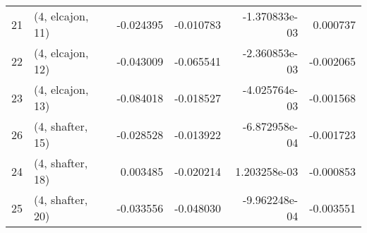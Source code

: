 \begin{tabular}{llrrrr}
21 &  (4, elcajon, 11) & -0.024395 & -0.010783 & -1.370833e-03 &  0.000737 \\
22 &  (4, elcajon, 12) & -0.043009 & -0.065541 & -2.360853e-03 & -0.002065 \\
23 &  (4, elcajon, 13) & -0.084018 & -0.018527 & -4.025764e-03 & -0.001568 \\
26 &  (4, shafter, 15) & -0.028528 & -0.013922 & -6.872958e-04 & -0.001723 \\
24 &  (4, shafter, 18) &  0.003485 & -0.020214 &  1.203258e-03 & -0.000853 \\
25 &  (4, shafter, 20) & -0.033556 & -0.048030 & -9.962248e-04 & -0.003551 \\
\bottomrule
\end{tabular}
